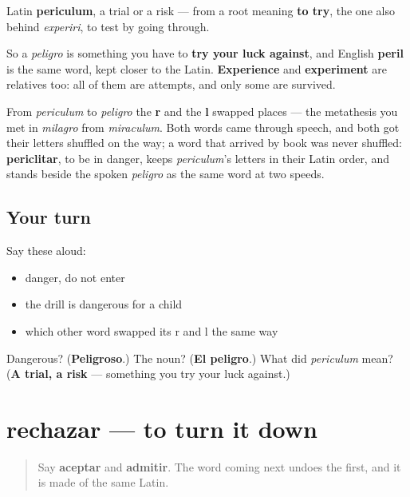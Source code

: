 \begin{cousinweb}
Latin \textbf{periculum}, a trial or a risk — from a root meaning \textbf{to try}, the one also behind \emph{experiri}, to test by going through.

So a \emph{peligro} is something you have to \textbf{try your luck against}, and English \textbf{peril} is the same word, kept closer to the Latin. \textbf{Experience} and \textbf{experiment} are relatives too: all of them are attempts, and only some are survived.

From \emph{periculum} to \emph{peligro} the \textbf{r} and the \textbf{l} swapped places — the metathesis you met in \emph{milagro} from \emph{miraculum}. Both words came through speech, and both got their letters shuffled on the way; a word that arrived by book was never shuffled: \textbf{periclitar}, to be in danger, keeps \emph{periculum}'s letters in their Latin order, and stands beside the spoken \emph{peligro} as the same word at two speeds.
\end{cousinweb}

\subsection*{Your turn}
Say these aloud:

\begin{itemize}
\raggedright
  \item danger, do not enter
  \item the drill is dangerous for a child
  \item which other word swapped its r and l the same way
\end{itemize}

\begin{tcolorbox}[breakable,colback=teal!4,colframe=teal!35!black,title={Before you move on}]
Dangerous? (\textbf{Peligroso}.) The noun? (\textbf{El peligro}.) What did \emph{periculum} mean? (\textbf{A trial, a risk} — something you try your luck against.)
\end{tcolorbox}
\section[rechazar]{rechazar — to turn it down}

\label{lesson:ES-C461-rechazar}



\begin{quote}
Say \textbf{aceptar} and \textbf{admitir}. The word coming next undoes the first, and it is made of the same Latin.
\end{quote}

